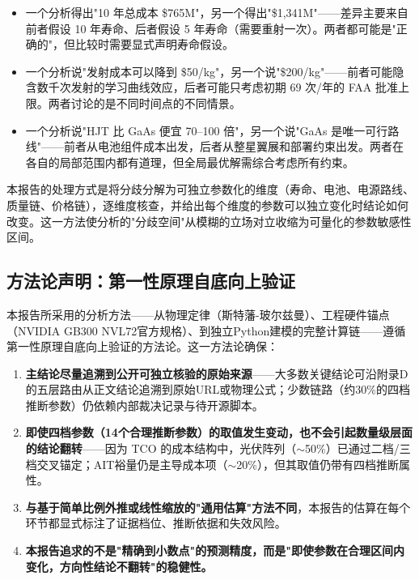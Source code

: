 \begin{itemize}[leftmargin=*]
    \item 一个分析得出"10 年总成本 \$765M"，另一个得出"\$1,341M"——差异主要来自前者假设 10 年寿命、后者假设 5 年寿命（需要重射一次）。两者都可能是"正确的"，但比较时需要显式声明寿命假设。
    \item 一个分析说"发射成本可以降到 \$50/kg"，另一个说"\$200/kg"——前者可能隐含数千次发射的学习曲线效应，后者可能只考虑初期 69 次/年的 FAA 批准上限。两者讨论的是不同时间点的不同情景。
    \item 一个分析说"HJT 比 GaAs 便宜 70--100 倍"，另一个说"GaAs 是唯一可行路线"——前者从电池组件成本出发，后者从整星翼展和部署约束出发。两者在各自的局部范围内都有道理，但全局最优解需综合考虑所有约束。
\end{itemize}

本报告的处理方式是将分歧分解为可独立参数化的维度（寿命、电池、电源路线、质量链、价格链），逐维度核查，并给出每个维度的参数可以独立变化时结论如何改变。这一方法使分析的"分歧空间"从模糊的立场对立收缩为可量化的参数敏感性区间。

\subsection{方法论声明：第一性原理自底向上验证}

本报告所采用的分析方法——从物理定律（斯特藩-玻尔兹曼）、工程硬件锚点（NVIDIA GB300 NVL72官方规格）、到独立Python建模的完整计算链——遵循第一性原理自底向上验证的方法论。这一方法论确保：

\begin{enumerate}[leftmargin=*]
    \item \textbf{主结论尽量追溯到公开可独立核验的原始来源}——大多数关键结论可沿附录D的五层路由从正文结论追溯到原始URL或物理公式；少数链路（约30\%的四档推断参数）仍依赖内部裁决记录与待开源脚本。
    \item \textbf{即使四档参数（14个合理推断参数）的取值发生变动，也不会引起数量级层面的结论翻转}——因为 TCO 的成本结构中，光伏阵列（$\sim$50\%）已通过二档/三档交叉锚定；AIT裕量仍是主导成本项（$\sim$20\%），但其取值仍带有四档推断属性。
    \item \textbf{与基于简单比例外推或线性缩放的"通用估算"方法不同}，本报告的估算在每个环节都显式标注了证据档位、推断依据和失效风险。
    \item \textbf{本报告追求的不是"精确到小数点"的预测精度，而是"即使参数在合理区间内变化，方向性结论不翻转"的稳健性。}
\end{enumerate}

\endinput
